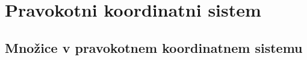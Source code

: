 \section{Pravokotni koordinatni sistem}

\begin{frame}
    \sectionpage
\end{frame}

\begin{frame}
\end{frame}


    \subsection{Množice v pravokotnem koordinatnem sistemu}

